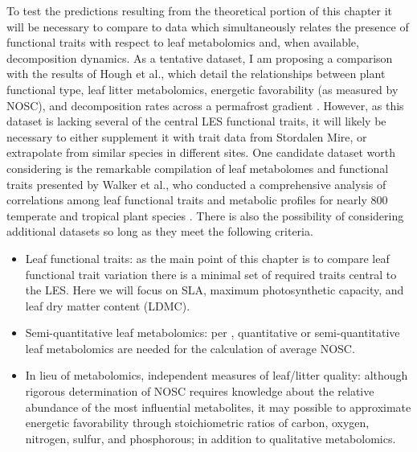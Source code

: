  To test the predictions resulting from the theoretical portion of this chapter it will be necessary to compare to data which simultaneously relates the presence of functional traits with respect to leaf metabolomics and, when available, decomposition dynamics. As a tentative dataset, I am proposing a comparison with the results of Hough et al., which detail the relationships between plant functional type, leaf litter metabolomics, energetic favorability (as measured by NOSC), and decomposition rates across a permafrost gradient \cite{hough2022a, wilson_advanced_2018}. However, as this dataset is lacking several of the central LES functional traits, it will likely be necessary to either supplement it with trait data from Stordalen Mire, or extrapolate from similar species in different sites. One candidate dataset worth considering is the remarkable compilation of leaf metabolomes and functional traits presented by Walker et al., who conducted a comprehensive analysis of correlations among leaf functional traits and metabolic profiles for nearly 800 temperate and tropical plant species \cite{walker_leaf_2023}. There is also the possibility of considering additional datasets so long as they meet the following criteria.

 \begin{itemize}
    \item Leaf functional traits: as the main point of this chapter is to compare leaf functional trait variation there is a minimal set of required traits central to the LES. Here we will focus on SLA, maximum photosynthetic capacity, and leaf dry matter content (LDMC).
    \item Semi-quantitative leaf metabolomics: per \cite{wilson_advanced_2018}, quantitative or semi-quantitative leaf metabolomics are needed for the calculation of average NOSC. 
    \item In lieu of metabolomics, independent measures of leaf/litter quality: although rigorous determination of NOSC requires knowledge about the relative abundance of the most influential metabolites, it may possible to approximate energetic favorability through stoichiometric ratios of carbon, oxygen, nitrogen, sulfur, and phosphorous; in addition to qualitative metabolomics. 
 \end{itemize}

 